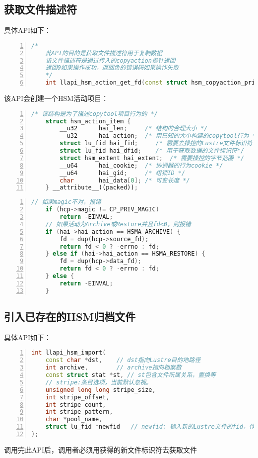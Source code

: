 \newpage
\subsection{获取文件描述符}
具体API如下：
\begin{lstlisting}[language={c++},numbers=left]
    /*
    此API的目的是获取文件描述符用于复制数据
    该文件描述符是通过传入的copyaction指针返回
    返回0如果操作成功，返回负的错误码如果操作失败
    */
    int llapi_hsm_action_get_fd(const struct hsm_copyaction_private *hcp);
\end{lstlisting}

该API会创建一个HSM活动项目：
\begin{lstlisting}[language={c++},numbers=left]
    /* 该结构是为了描述copytool项目行为的 */
    struct hsm_action_item {
        __u32      hai_len;     /* 结构的合理大小 */
        __u32      hai_action;  /* 用已知的大小构建的copytool行为 */
        struct lu_fid hai_fid;     /* 需要去操控的Lustre文件标识符 */
        struct lu_fid hai_dfid;    /* 用于获取数据的文件标识符*/
        struct hsm_extent hai_extent;  /* 需要操控的字节范围 */
        __u64      hai_cookie;  /* 协调器的行为cookie */
        __u64      hai_gid;     /* 组锁ID */
        char       hai_data[0]; /* 可变长度 */
    } __attribute__((packed));
\end{lstlisting}

\begin{lstlisting}[language={c++},numbers=left]
    // 如果magic不对，报错
	if (hcp->magic != CP_PRIV_MAGIC)
		return -EINVAL;
    // 如果活动为Archive或Restore并且fd<0，则报错
	if (hai->hai_action == HSMA_ARCHIVE) {
		fd = dup(hcp->source_fd);
		return fd < 0 ? -errno : fd;
	} else if (hai->hai_action == HSMA_RESTORE) {
		fd = dup(hcp->data_fd);
		return fd < 0 ? -errno : fd;
	} else {
		return -EINVAL;
	}
\end{lstlisting}

\subsection{引入已存在的HSM归档文件}
具体API如下：
\begin{lstlisting}[language={c++},numbers=left]
int llapi_hsm_import(
    const char *dst,    // dst指向Lustre目的地路径
    int archive,        // archive指向档案数
    const struct stat *st, // st包含文件所属关系，置换等
    // stripe:条目选项，当前默认忽视。
    unsigned long long stripe_size, 
    int stripe_offset,
    int stripe_count, 
    int stripe_pattern, 
    char *pool_name,
    struct lu_fid *newfid   // newfid: 输入新的Lustre文件的fid，作为输出
);
\end{lstlisting}
调用完此API后，调用者必须用获得的新文件标识符去获取文件

